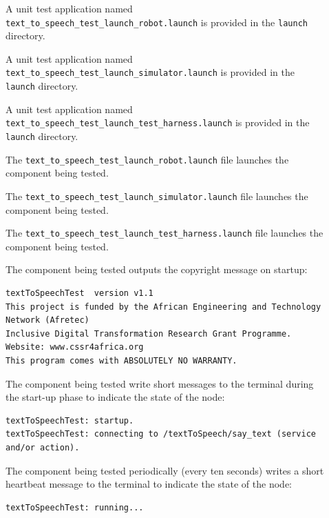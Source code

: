 \documentclass{CSSRforAfrica}
\newcommand{\checkboxChecked}{\fbox{\ding{51}}} %
\newcommand{\checkboxDashed}{\fbox{--}}         %
\begin{document}
\begin{description}

\item[\checkboxChecked] A unit test application named {\small \verb+text_to_speech_test_launch_robot.launch+} is provided in the {\small \verb+launch+} directory. 

\item[\checkboxDashed] A unit test application named {\small \verb+text_to_speech_test_launch_simulator.launch+} is provided in the {\small \verb+launch+} directory.

\item[\checkboxChecked] A unit test application named {\small \verb+text_to_speech_test_launch_test_harness.launch+} is provided in the {\small \verb+launch+} directory.

\item[\checkboxChecked] The {\small \verb+text_to_speech_test_launch_robot.launch+} file  launches the component being tested.

\item[\checkboxDashed] The {\small \verb+text_to_speech_test_launch_simulator.launch+} file  launches the component being tested.

\item[\checkboxChecked] The {\small \verb+text_to_speech_test_launch_test_harness.launch+} file  launches the component being tested.

\item[\checkboxChecked] The component being tested outputs the copyright message on startup:  \\ 
{\scriptsize
\begin{verbatim}
textToSpeechTest  version v1.1
This project is funded by the African Engineering and Technology Network (Afretec)
Inclusive Digital Transformation Research Grant Programme.
Website: www.cssr4africa.org
This program comes with ABSOLUTELY NO WARRANTY.
\end{verbatim}
}

\item[\checkboxChecked] The component being tested write short messages to the terminal  during the start-up phase to indicate the state of the node:
{\small
\begin{verbatim}
textToSpeechTest: startup.
textToSpeechTest: connecting to /textToSpeech/say_text (service and/or action).
\end{verbatim}
} 

\item[\checkboxChecked] The component being tested periodically (every ten seconds) writes a short heartbeat message to the terminal to indicate the state of the node:
{\small
\begin{verbatim}
textToSpeechTest: running...
\end{verbatim}
}


\end{description}
\end{document}
